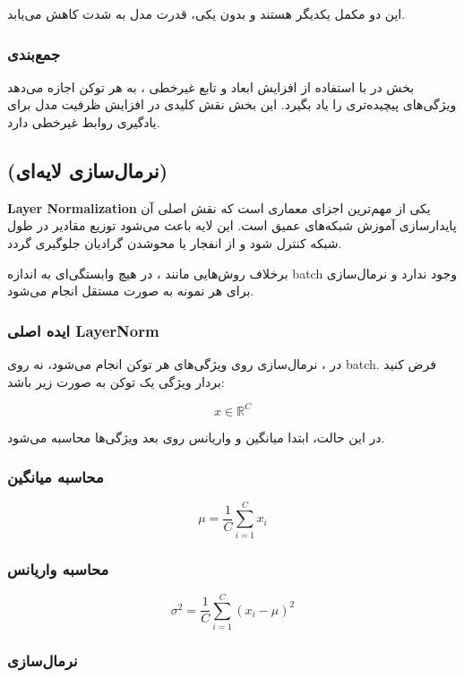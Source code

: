 \documentclass{article}
\begin{document}
این دو مکمل یکدیگر هستند و بدون یکی، قدرت مدل به شدت کاهش می‌یابد.

\subsubsection*{جمع‌بندی}

بخش  در  با استفاده از افزایش ابعاد و تابع غیرخطی ، به هر توکن اجازه می‌دهد ویژگی‌های پیچیده‌تری را یاد بگیرد. این بخش نقش کلیدی در افزایش ظرفیت مدل برای یادگیری روابط غیرخطی دارد.

\subsection{ (نرمال‌سازی لایه‌ای)}

\textbf{Layer Normalization} یکی از مهم‌ترین اجزای معماری  است که نقش اصلی آن پایدارسازی آموزش شبکه‌های عمیق است. این لایه باعث می‌شود توزیع مقادیر در طول شبکه کنترل شود و از انفجار یا محوشدن گرادیان جلوگیری گردد.

برخلاف روش‌هایی مانند ، در  هیچ وابستگی‌ای به اندازه batch وجود ندارد و نرمال‌سازی برای هر نمونه به صورت مستقل انجام می‌شود.

\subsubsection*{ایده اصلی LayerNorm}

در ، نرمال‌سازی روی ویژگی‌های هر توکن انجام می‌شود، نه روی batch. فرض کنید بردار ویژگی یک توکن به صورت زیر باشد:

\[
x \in \mathbb{R}^{C}
\]

در این حالت، ابتدا میانگین و واریانس روی بعد ویژگی‌ها محاسبه می‌شود.

\subsubsection*{محاسبه میانگین}

\[
\mu = \frac{1}{C} \sum_{i=1}^{C} x_i
\]

\subsubsection*{محاسبه واریانس}

\[
\sigma^2 = \frac{1}{C} \sum_{i=1}^{C} (x_i - \mu)^2
\]

\subsubsection*{نرمال‌سازی}
\end{document}
